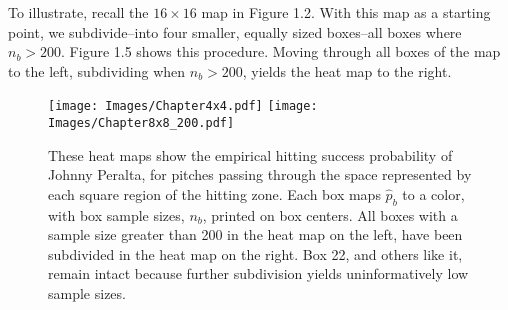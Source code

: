 To illustrate, recall the $16 \times 16$ map in Figure 1.2. With this map as a starting point, we subdivide--into four smaller, equally sized boxes--all boxes where $n_{b} > 200$. Figure 1.5 shows this procedure. Moving through all boxes of the map to the left, subdividing when $n_{b} > 200$, yields the heat map to the right.
        \begin{figure}[H]
      	\centering
      	\texttt{[image: Images/Chapter4x4.pdf]} 
      	\texttt{[image: Images/Chapter8x8\_200.pdf]} 
      	\caption{These heat maps show the empirical hitting success probability of Johnny Peralta, for pitches passing through the space represented by each square region of the hitting zone.  Each box maps $\hat{p}_{b}$ to a color, with box sample sizes, $n_{b}$, printed on box centers. All boxes with a sample size greater than 200 in the heat map on the left, have been subdivided in the heat map on the right. Box 22, and others like it, remain intact because further subdivision yields uninformatively low sample sizes.}
      	\end{figure} 
      	
      	
